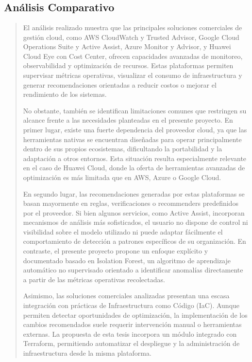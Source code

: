 \documentclass[
]{article}
\begin{document}
\section{\texorpdfstring{\hfill\break
}{ }}\label{section}

\subsection{Análisis Comparativo}\label{anuxe1lisis-comparativo}

\begin{quote}
El análisis realizado muestra que las principales soluciones comerciales
de gestión cloud, como AWS CloudWatch y Trusted Advisor, Google Cloud
Operations Suite y Active Assist, Azure Monitor y Advisor, y Huawei
Cloud Eye con Cost Center, ofrecen capacidades avanzadas de monitoreo,
observabilidad y optimización de recursos. Estas plataformas permiten
supervisar métricas operativas, visualizar el consumo de infraestructura
y generar recomendaciones orientadas a reducir costos o mejorar el
rendimiento de los sistemas.

No obstante, también se identifican limitaciones comunes que restringen
su alcance frente a las necesidades planteadas en el presente proyecto.
En primer lugar, existe una fuerte dependencia del proveedor cloud, ya
que las herramientas nativas se encuentran diseñadas para operar
principalmente dentro de sus propios ecosistemas, dificultando la
portabilidad y la adaptación a otros entornos. Esta situación resulta
especialmente relevante en el caso de Huawei Cloud, donde la oferta de
herramientas avanzadas de optimización es más limitada que en AWS, Azure
o Google Cloud.

En segundo lugar, las recomendaciones generadas por estas plataformas se
basan mayormente en reglas, verificaciones o recommenders predefinidos
por el proveedor. Si bien algunos servicios, como Active Assist,
incorporan mecanismos de análisis más sofisticados, el usuario no
dispone de control ni visibilidad sobre el modelo utilizado ni puede
adaptar fácilmente el comportamiento de detección a patrones específicos
de su organización. En contraste, el presente proyecto propone un
enfoque explícito y documentado basado en Isolation Forest, un algoritmo
de aprendizaje automático no supervisado orientado a identificar
anomalías directamente a partir de las métricas operativas recolectadas.

Asimismo, las soluciones comerciales analizadas presentan una escasa
integración con prácticas de Infraestructura como Código (IaC). Aunque
permiten detectar oportunidades de optimización, la implementación de
los cambios recomendados suele requerir intervención manual o
herramientas externas. La propuesta de esta tesis incorpora un módulo
integrado con Terraform, permitiendo automatizar el despliegue y la
administración de infraestructura desde la misma plataforma.


\end{quote}
\end{document}
